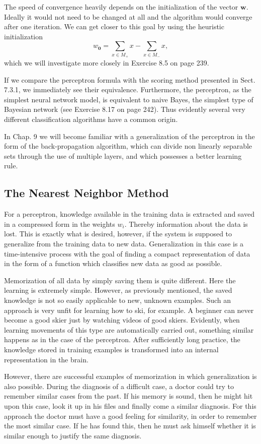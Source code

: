\documentclass[10pt]{book}
\begin{document}
The speed of convergence heavily depends on the initialization of the vector $\boldsymbol{w}$. Ideally it would not need to be changed at all and the algorithm would converge after one iteration. We can get closer to this goal by using the heuristic initialization
$$
w_{\mathbf{0}}=\sum_{x \in M_{+}} x-\sum_{x \in M_{-}} x,
$$
which we will investigate more closely in Exercise 8.5 on page 239.

If we compare the perceptron formula with the scoring method presented in Sect. 7.3.1, we immediately see their equivalence. Furthermore, the perceptron, as the simplest neural network model, is equivalent to naive Bayes, the simplest type of Bayesian network (see Exercise 8.17 on page 242). Thus evidently several very different classification algorithms have a common origin.

In Chap. 9 we will become familiar with a generalization of the perceptron in the form of the back-propagation algorithm, which can divide non linearly separable sets through the use of multiple layers, and which possesses a better learning rule.

\subsection{The Nearest Neighbor Method}
For a perceptron, knowledge available in the training data is extracted and saved in a compressed form in the weights $w_{i}$. Thereby information about the data is lost. This is exactly what is desired, however, if the system is supposed to generalize from the training data to new data. Generalization in this case is a time-intensive process with the goal of finding a compact representation of data in the form of a function which classifies new data as good as possible.

Memorization of all data by simply saving them is quite different. Here the learning is extremely simple. However, as previously mentioned, the saved knowledge is not so easily applicable to new, unknown examples. Such an approach is very unfit for learning how to ski, for example. A beginner can never become a good skier just by watching videos of good skiers. Evidently, when learning movements of this type are automatically carried out, something similar happens as in the case of the perceptron. After sufficiently long practice, the knowledge stored in training examples is transformed into an internal representation in the brain.

However, there are successful examples of memorization in which generalization is also possible. During the diagnosis of a difficult case, a doctor could try to remember similar cases from the past. If his memory is sound, then he might hit upon this case, look it up in his files and finally come a similar diagnosis. For this approach the doctor must have a good feeling for similarity, in order to remember the most similar case. If he has found this, then he must ask himself whether it is similar enough to justify the same diagnosis.
\end{document}
